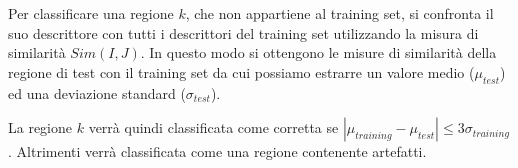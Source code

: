 Per classificare una regione $k$, che non appartiene al training set, si confronta il suo descrittore con tutti i descrittori del training set utilizzando la misura di similarità $Sim(I, J)$. In questo modo si ottengono le misure di similarità della regione di test con il training set da cui possiamo estrarre un valore medio ($\mu_{test}$) ed una deviazione standard ($\sigma_{test}$).

La regione $k$ verrà quindi classificata come corretta se \mbox{$ |\mu_{training}- \mu_{test}| \le 3\sigma_{training}$}. Altrimenti verrà classificata come una regione contenente artefatti.
\pagebreak
